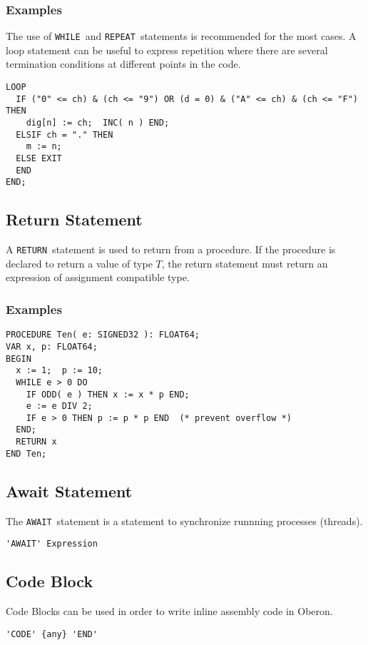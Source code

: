 \documentclass[a4wide,11pt]{article}
\newcommand{\WHILE}{\lstinline"WHILE"}
\newcommand{\REPEAT}{\lstinline"REPEAT"}
\newcommand{\RETURN}{\lstinline"RETURN"}
\newcommand{\AWAIT}{\lstinline"AWAIT"}
\begin{document}
\begin{annotation}
\subsubsection{Examples}
The use of \WHILE\ and \REPEAT\ statements is recommended for the most cases.
A loop statement can be useful to express repetition where there are several termination conditions at different points in the code.

\begin{lstlisting}[style=example]
LOOP
  IF ("0" <= ch) & (ch <= "9") OR (d = 0) & ("A" <= ch) & (ch <= "F") THEN
    dig[n] := ch;  INC( n ) END;
  ELSIF ch = "." THEN
  	m := n;
  ELSE EXIT
  END
END;
\end{lstlisting}
\end{annotation}

\subsection{Return Statement}
A \RETURN\ statement is used to return from a procedure.
If the procedure is declared to return a value of type $T$, the return statement must return an expression of assignment compatible type.

\begin{annotation}
\subsubsection{Examples}
\begin{lstlisting}[style=example]
PROCEDURE Ten( e: SIGNED32 ): FLOAT64;
VAR x, p: FLOAT64;
BEGIN
  x := 1;  p := 10;
  WHILE e > 0 DO
    IF ODD( e ) THEN x := x * p END;
    e := e DIV 2;
    IF e > 0 THEN p := p * p END  (* prevent overflow *)
  END;
  RETURN x
END Ten;
\end{lstlisting}
\end{annotation}


\subsection{Await Statement}
The \AWAIT\ statement is a statement to synchronize runnning processes (threads).

\begin{lstlisting}[style=ebnf]
'AWAIT' Expression
\end{lstlisting}


\subsection{Code Block}
Code Blocks can be used in order to write inline assembly code in Oberon.
\begin{lstlisting}[style=ebnf]
'CODE' {any} 'END'
\end{lstlisting}
\end{document}
